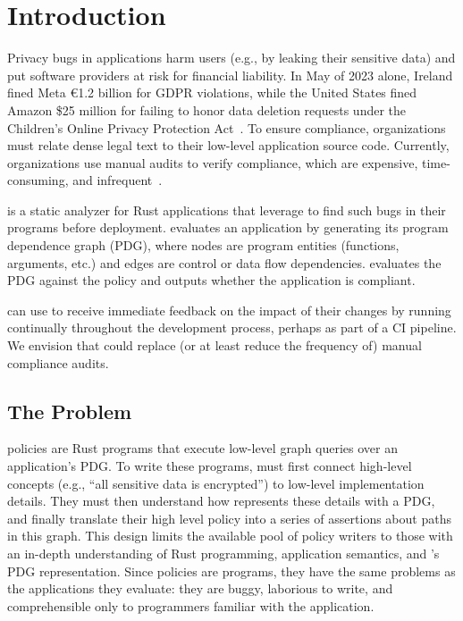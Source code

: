 \chapter{Introduction}
\label{sec:intro}

Privacy bugs in applications harm users (e.g., by leaking their sensitive data) and put software providers 
at risk for financial liability.
%
In May of 2023 alone, Ireland fined Meta €1.2 billion for GDPR violations, 
while the United States fined Amazon \$25 million for failing to honor data deletion requests 
under the Children’s Online Privacy Protection Act~\cite{meta-fine,amazon-fine}.
%
To ensure compliance, organizations must relate dense legal text to their low-level application source code.
%
Currently, organizations use manual audits to verify compliance, which are expensive, time-consuming,
and infrequent~\cite{CostContinuousCompliance2020,smithGDPRRacketWho}.
%

\sys{} is a static analyzer for Rust applications that \devs{} leverage to find such bugs in their programs before deployment.
%
\sys{} evaluates an application by generating its program dependence graph (PDG), 
where nodes are program entities (functions, arguments, etc.) and edges are control or data flow dependencies.
%
\sys{} evaluates the PDG against the policy and outputs whether the application is compliant.

\Devs{} can use \sys{} to receive immediate feedback on the impact of their changes by running 
\sys{} continually throughout the development process, perhaps as part of a CI pipeline.
%
We envision that \sys{} could replace (or at least reduce the frequency of) manual compliance audits.


\section{The Problem}
\sys{} policies are Rust programs that execute low-level graph queries over an application's PDG.
%
To write these programs, \devs{} must first connect high-level concepts 
(e.g., ``all sensitive data is encrypted'')
to low-level implementation details.
%
They must then understand how \sys{} represents these details with a PDG,
and finally translate their high level policy into a series of assertions about paths in this graph.
%
This design limits the available pool of policy writers to those with 
an in-depth understanding of Rust programming, application semantics, and \sys{}'s PDG representation.
%
Since policies are programs, they have the same problems as the applications they evaluate: 
they are buggy, laborious to write, and comprehensible only to programmers familiar with the application.

